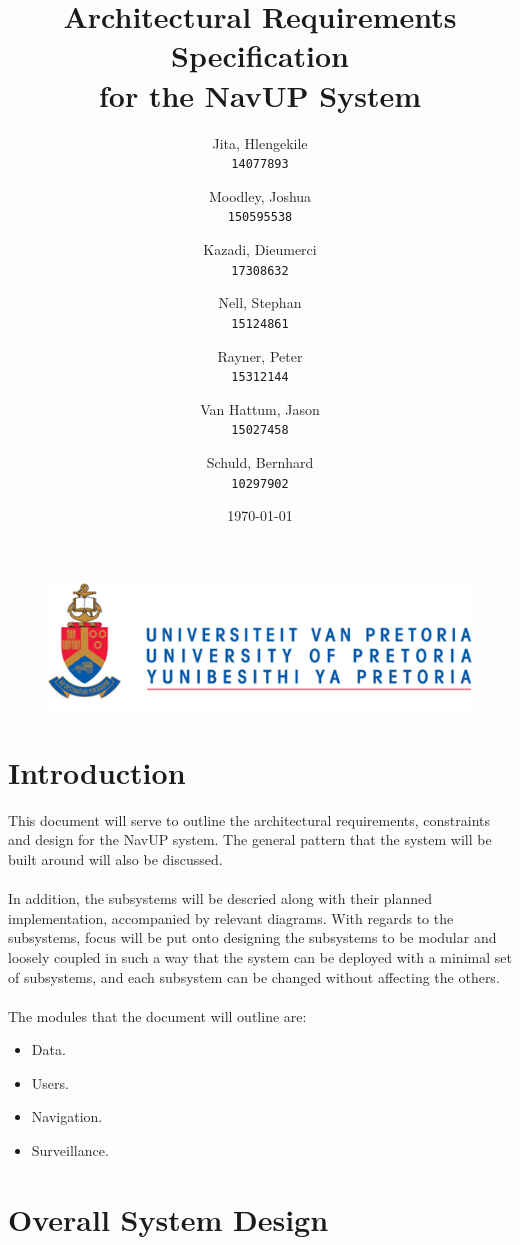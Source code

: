 \documentclass[english]{article}
\author{
	Jita, Hlengekile\\
	\texttt{14077893}
	\and
	Moodley, Joshua\\
	\texttt{150595538}
	\and
	Kazadi, Dieumerci\\
	\texttt{17308632}
	\and
	Nell, Stephan\\
	\texttt{15124861}
	\and
	Rayner, Peter\\
	\texttt{15312144}
	\and
	Van Hattum, Jason\\
	\texttt{15027458}
	\and
	Schuld, Bernhard\\
	\texttt{10297902}
}
\title{Architectural Requirements Specification\\
	for the NavUP System\\
	}
\date{\today}
\begin{document}
    \fboxsep=2mm

	\maketitle
	\begin{figure}[!t]
		\includegraphics{up_logo.png}
	\end{figure}
	\newpage

	\tableofcontents
	\newpage



	\section{Introduction}

		This document will serve to outline the architectural requirements, constraints and design for the NavUP system. The general pattern that the system will be built around will also be discussed.\\
        \\
		In addition, the subsystems will be descried along with their planned implementation, accompanied by relevant diagrams. With regards to the subsystems, focus will be put onto designing the subsystems to be modular and loosely coupled in such a way that the system can be deployed with a minimal set of subsystems, and each subsystem can be changed without affecting the others.\\
		\\
		The modules that the document will outline are:
		\begin{itemize}
		    \item Data.
		    \item Users.
		    \item Navigation.
		    \item Surveillance.
		\end{itemize}

    \section{Overall System Design}
\end{document}
